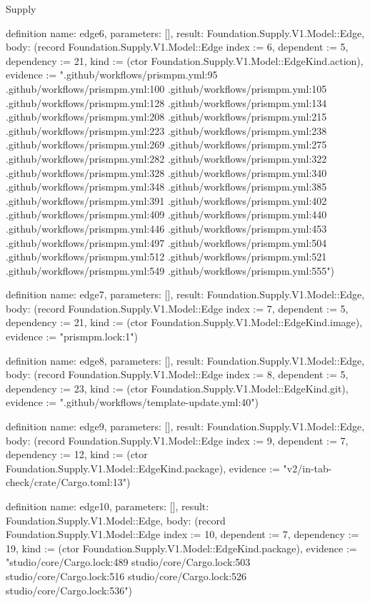 \begin{lexlean}{Supply}
\begin{semanticmodule}
definition{
  name: edge6,
  parameters: [],
  result: Foundation.Supply.V1.Model::Edge,
  body: (record Foundation.Supply.V1.Model::Edge {index := 6, dependent := 5, dependency := 21, kind := (ctor Foundation.Supply.V1.Model::EdgeKind.action), evidence := ".github/workflows/prismpm.yml:95 .github/workflows/prismpm.yml:100 .github/workflows/prismpm.yml:105 .github/workflows/prismpm.yml:128 .github/workflows/prismpm.yml:134 .github/workflows/prismpm.yml:208 .github/workflows/prismpm.yml:215 .github/workflows/prismpm.yml:223 .github/workflows/prismpm.yml:238 .github/workflows/prismpm.yml:269 .github/workflows/prismpm.yml:275 .github/workflows/prismpm.yml:282 .github/workflows/prismpm.yml:322 .github/workflows/prismpm.yml:328 .github/workflows/prismpm.yml:340 .github/workflows/prismpm.yml:348 .github/workflows/prismpm.yml:385 .github/workflows/prismpm.yml:391 .github/workflows/prismpm.yml:402 .github/workflows/prismpm.yml:409 .github/workflows/prismpm.yml:440 .github/workflows/prismpm.yml:446 .github/workflows/prismpm.yml:453 .github/workflows/prismpm.yml:497 .github/workflows/prismpm.yml:504 .github/workflows/prismpm.yml:512 .github/workflows/prismpm.yml:521 .github/workflows/prismpm.yml:549 .github/workflows/prismpm.yml:555"})
}

definition{
  name: edge7,
  parameters: [],
  result: Foundation.Supply.V1.Model::Edge,
  body: (record Foundation.Supply.V1.Model::Edge {index := 7, dependent := 5, dependency := 21, kind := (ctor Foundation.Supply.V1.Model::EdgeKind.image), evidence := "prismpm.lock:1"})
}

definition{
  name: edge8,
  parameters: [],
  result: Foundation.Supply.V1.Model::Edge,
  body: (record Foundation.Supply.V1.Model::Edge {index := 8, dependent := 5, dependency := 23, kind := (ctor Foundation.Supply.V1.Model::EdgeKind.git), evidence := ".github/workflows/template-update.yml:40"})
}

definition{
  name: edge9,
  parameters: [],
  result: Foundation.Supply.V1.Model::Edge,
  body: (record Foundation.Supply.V1.Model::Edge {index := 9, dependent := 7, dependency := 12, kind := (ctor Foundation.Supply.V1.Model::EdgeKind.package), evidence := "v2/in-tab-check/crate/Cargo.toml:13"})
}

definition{
  name: edge10,
  parameters: [],
  result: Foundation.Supply.V1.Model::Edge,
  body: (record Foundation.Supply.V1.Model::Edge {index := 10, dependent := 7, dependency := 19, kind := (ctor Foundation.Supply.V1.Model::EdgeKind.package), evidence := "studio/core/Cargo.lock:489 studio/core/Cargo.lock:503 studio/core/Cargo.lock:516 studio/core/Cargo.lock:526 studio/core/Cargo.lock:536"})
}


\end{semanticmodule}
\end{lexlean}
